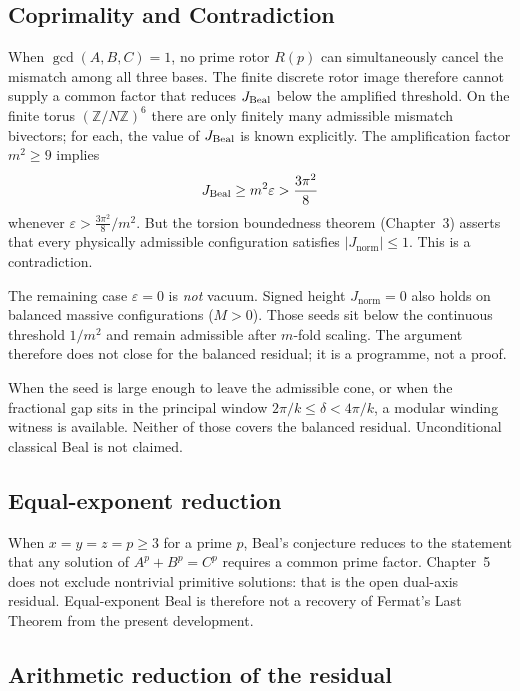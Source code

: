 \documentclass[a4paper]{article}
\theoremstyle{definition}
\theoremstyle{remark}
\newcommand{\Jnorm}{J_{\mathrm{norm}}}
\newcommand{\Jbound}{\frac{3\pi^2}{8}}
\begin{document}
\subsection{Coprimality and Contradiction}

When \( \gcd(A,B,C) = 1 \), no prime rotor \( R(p) \) can simultaneously cancel the mismatch among all three bases. The finite discrete rotor image therefore cannot supply a common factor that reduces \( J_{\rm Beal} \) below the amplified threshold. On the finite torus \( (\mathbb{Z}/N\mathbb{Z})^6 \) there are only finitely many admissible mismatch bivectors; for each, the value of \( J_{\rm Beal} \) is known explicitly. The amplification factor \( m^2 \geq 9 \) implies
\[
J_{\rm Beal} \geq m^2 \varepsilon > \Jbound
\]
whenever \( \varepsilon > \Jbound / m^2 \). But the torsion boundedness theorem (Chapter~3) asserts that every physically admissible configuration satisfies \( |\Jnorm| \leq 1 \). This is a contradiction.

The remaining case \(\varepsilon = 0\) is \emph{not} vacuum. Signed height \(\Jnorm=0\) also holds on balanced massive configurations (\(M>0\)). Those seeds sit below the continuous threshold \(1/m^2\) and remain admissible after \(m\)-fold scaling. The argument therefore does not close for the balanced residual; it is a programme, not a proof.

When the seed is large enough to leave the admissible cone, or when the fractional gap sits in the principal window \(2\pi/k\le\delta<4\pi/k\), a modular winding witness is available. Neither of those covers the balanced residual. Unconditional classical Beal is not claimed.

\subsection{Equal-exponent reduction}

When \( x = y = z = p \geq 3 \) for a prime \( p \), Beal’s conjecture reduces to the statement that any solution of \( A^p + B^p = C^p \) requires a common prime factor. Chapter~5 does not exclude nontrivial primitive solutions: that is the open dual-axis residual. Equal-exponent Beal is therefore not a recovery of Fermat's Last Theorem from the present development.

\subsection{Arithmetic reduction of the residual}
\end{document}
